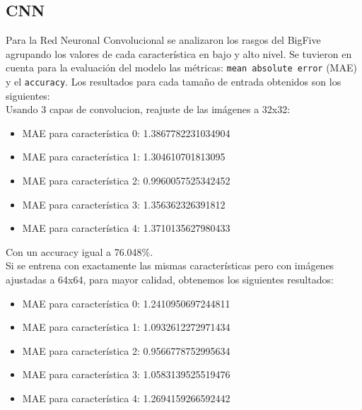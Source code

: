 \documentclass[10pt, a4paper]{article}
\begin{document}
            \subsection{CNN} 
                Para la Red Neuronal Convolucional se analizaron los rasgos del BigFive agrupando los valores de cada caracter\'istica en bajo y alto nivel. 
                Se tuvieron en cuenta para la evaluaci\'on del modelo las m\'etricas: \texttt{mean absolute error} (MAE) y el \texttt{accuracy}.
                Los resultados para cada tama\~no de entrada obtenidos son los siguientes: \\

                Usando 3 capas de convolucion, reajuste de las im\'agenes a 32x32:\\
                \begin{itemize}
                    \item[] MAE para caracter\'istica 0: 1.3867782231034904 
                    \item[] MAE para caracter\'istica 1: 1.304610701813095 
                    \item[] MAE para caracter\'istica 2: 0.9960057525342452
                    \item[] MAE para caracter\'istica 3: 1.356362326391812
                    \item[] MAE para caracter\'istica 4: 1.3710135627980433
                \end{itemize}
                
                Con un accuracy igual a 76.048\%.\\

                Si se entrena con exactamente las mismas caracter\'isticas pero con im\'agenes ajustadas a 64x64, para mayor calidad, obtenemos los siguientes resultados:
                \begin{itemize}
                    \item[] MAE para caracter\'istica 0: 1.2410950697244811
                    \item[] MAE para caracter\'istica 1: 1.0932612272971434
                    \item[] MAE para caracter\'istica 2: 0.9566778752995634
                    \item[] MAE para caracter\'istica 3: 1.0583139525519476
                    \item[] MAE para caracter\'istica 4: 1.2694159266592442
                \end{itemize}
                
\end{document}
